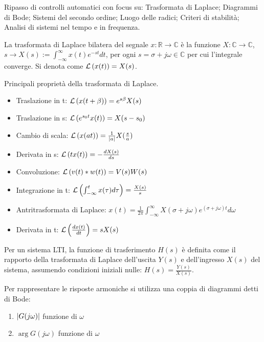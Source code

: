 Ripasso di controlli automatici con focus su: Trasformata di Laplace; Diagrammi di Bode; Sistemi del secondo ordine; Luogo delle radici; Criteri di stabilità; Analisi di sistemi nel tempo e in frequenza.

La trasformata di Laplace bilatera del segnale $x:\mathbb{R} \rightarrow \mathbb{C}$ è la funzione $X:\mathbb{C} \rightarrow \mathbb{C}$, $s \rightarrow X(s) := \int^\infty_{-\infty} x(t)e^{-st} dt $, per ogni $s=\sigma + j\omega\in \mathbb{C}$ per cui l'integrale converge. Si denota come $\mathcal{L}\left(x(t)\right) = X(s)$.

Principali proprietà della trasformata di Laplace.
\begin{itemize}
    \item Traslazione in t: $\mathcal{L}\left(x(t+\beta)\right) = e^{s\beta}X(s)$
    \item Traslazione in s: $\mathcal{L}\left(e^{s_0t}x(t)\right) = X(s-s_0)$
    \item Cambio di scala: $\mathcal{L}\left(x(at)\right) = \frac{1}{\left|a\right|}X(\frac{s}{a})$
    \item Derivata in s: $\mathcal{L}\left(tx(t)\right)=-\frac{dX(s)}{ds}$
    \item Convoluzione: $\mathcal{L}\left(v(t)*w(t)\right) = V(s)W(s)$
    \item Integrazione in t: $\mathcal{L}\left(\int^t_{-\infty} x(\tau) d\tau \right)=\frac{X(s)}{s}$
    \item Antritrasformata di Laplace: $x(t)=\frac{1}{2\pi} \int^\infty_{-\infty}X(\sigma+j\omega) e^{(\sigma+j\omega)t} d\omega$
    \item Derivata in t: $\mathcal{L}\left(\frac{dx(t)}{dt}\right) = s X(s)$
\end{itemize}


Per un sistema LTI, la funzione di trasferimento \(H(s)\) è definita come il rapporto della trasformata di Laplace dell'uscita \(Y(s)\) e dell'ingresso \(X(s)\) del sistema, assumendo condizioni iniziali nulle:
\(H(s)=\frac{Y(s)}{X(s)}\).

Per rappresentare le risposte armoniche si utilizza una coppia di diagrammi detti di Bode:
\begin{enumerate}
    \item $\left|G(j\omega)\right|$ funzione di $\omega$
    \item $\arg{G(j\omega)}$ funzione di $\omega$
\end{enumerate}

